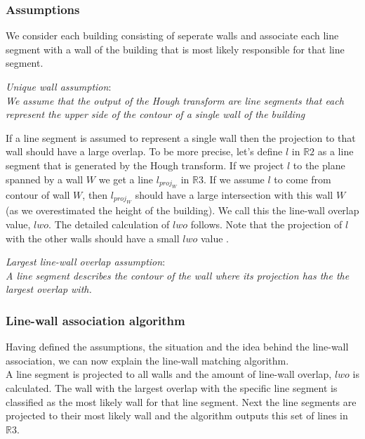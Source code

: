 \documentclass[10pt]{article}
\begin{document}
{	\subsubsection{Assumptions}
	We consider each building consisting of seperate walls and associate each
	line segment with a wall of the building that is most likely responsible for
	that line segment. 

	\emph{Unique wall assumption}:\\
	\emph{We assume that the output of the Hough transform are line segments that
	each represent the upper side of the contour of a single wall of the building}






	If a line segment is assumed to represent a single wall then the
	projection to that wall should have a large overlap. 
	To be more precise, let's define $l$ in $\mathbb{R}2$ as a line segment that is generated by the Hough
	transform.  If we project $l$ to the plane spanned by a wall $W$ we get a line $l_{proj_W}$ in $\mathbb{R}3$.  
	If we assume $l$ to come from contour of wall $W$, then $l_{proj_W}$ should
	have a large intersection with this wall $W$ (as we overestimated the height of
	the building). We call this the line-wall overlap value, $lwo$. The detailed
	calculation of $lwo$ follows.  Note that the projection of $l$ with the other walls should
	have a small $lwo$ value .
	
	\emph{Largest line-wall overlap assumption}:\\
	\emph{A line segment describes the contour of the wall where its projection
	has the the largest overlap with.}\\

	\subsubsection{Line-wall association algorithm}
	Having defined the assumptions, the situation and the idea behind the
	line-wall association, we can now explain the line-wall matching algorithm.\\
	A line segment is projected to all walls and the amount of line-wall
	overlap, $lwo$ is calculated. The wall with the largest overlap with the specific line
segment is classified as the most likely wall for that line segment.
	Next the line segments are projected to their most likely wall and the
	algorithm outputs this set of lines in $\mathbb{R}3$. 
	
}
\end{document}
